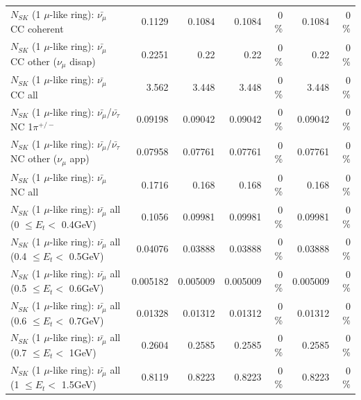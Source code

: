 \begin{table}
\begin{tabular}{| l | r | r | r  r | r  r |}
                       $N_{SK}$ (1 $\mu$-like ring): $\bar{\nu_\mu}$ CC coherent &          0.1129 &          0.1084 &          0.1084 &        0 \%  &          0.1084 &        0 \%  \\ 
        $N_{SK}$ (1 $\mu$-like ring): $\bar{\nu_\mu}$ CC other ($\nu_\mu$ disap) &          0.2251 &            0.22 &            0.22 &        0 \%  &            0.22 &        0 \%  \\ 
                          $N_{SK}$ (1 $\mu$-like ring): $\bar{\nu_{\mu}}$ CC all &           3.562 &           3.448 &           3.448 &        0 \%  &           3.448 &        0 \%  \\ 
\hline
  $N_{SK}$ (1 $\mu$-like ring): $\bar{\nu_\mu}$/$\bar{\nu_\tau}$ NC 1$\pi^{+/-}$ &         0.09198 &         0.09042 &         0.09042 &        0 \%  &         0.09042 &        0 \%  \\ 
$N_{SK}$ (1 $\mu$-like ring): $\bar{\nu_\mu}$/$\bar{\nu_\tau}$ NC other ($\nu_\mu$ app) &         0.07958 &         0.07761 &         0.07761 &        0 \%  &         0.07761 &        0 \%  \\ 
                          $N_{SK}$ (1 $\mu$-like ring): $\bar{\nu_{\mu}}$ NC all &          0.1716 &           0.168 &           0.168 &        0 \%  &           0.168 &        0 \%  \\ 
\hline
   $N_{SK}$ (1 $\mu$-like ring): $\bar{\nu_{\mu}}$ all (0 $\leq E_{t} <$ 0.4GeV) &          0.1056 &         0.09981 &         0.09981 &        0 \%  &         0.09981 &        0 \%  \\ 
 $N_{SK}$ (1 $\mu$-like ring): $\bar{\nu_{\mu}}$ all (0.4 $\leq E_{t} <$ 0.5GeV) &         0.04076 &         0.03888 &         0.03888 &        0 \%  &         0.03888 &        0 \%  \\ 
 $N_{SK}$ (1 $\mu$-like ring): $\bar{\nu_{\mu}}$ all (0.5 $\leq E_{t} <$ 0.6GeV) &        0.005182 &        0.005009 &        0.005009 &        0 \%  &        0.005009 &        0 \%  \\ 
 $N_{SK}$ (1 $\mu$-like ring): $\bar{\nu_{\mu}}$ all (0.6 $\leq E_{t} <$ 0.7GeV) &         0.01328 &         0.01312 &         0.01312 &        0 \%  &         0.01312 &        0 \%  \\ 
   $N_{SK}$ (1 $\mu$-like ring): $\bar{\nu_{\mu}}$ all (0.7 $\leq E_{t} <$ 1GeV) &          0.2604 &          0.2585 &          0.2585 &        0 \%  &          0.2585 &        0 \%  \\ 
   $N_{SK}$ (1 $\mu$-like ring): $\bar{\nu_{\mu}}$ all (1 $\leq E_{t} <$ 1.5GeV) &          0.8119 &          0.8223 &          0.8223 &        0 \%  &          0.8223 &        0 \%  \\ 

\end{tabular}
\end{table}
